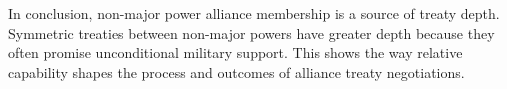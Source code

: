 \documentclass[12pt]{article}
\begin{document}
In conclusion, non-major power alliance membership is a source of treaty depth. 
Symmetric treaties between non-major powers have greater depth because they often promise unconditional military support. 
This shows the way relative capability shapes the process and outcomes of alliance treaty negotiations. 



\singlespace
 
 
\end{document}
